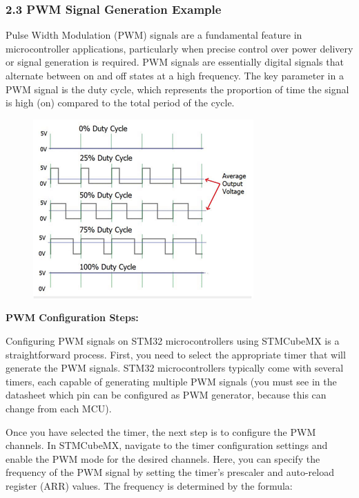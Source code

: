 \documentclass[10pt,a4paper,onecolumn]{article}
\begin{document}
\hypertarget{pwm-signal-generation-example}{%
\subsubsection{2.3 PWM Signal Generation
Example}\label{pwm-signal-generation-example}}

Pulse Width Modulation (PWM) signals are a fundamental feature in
microcontroller applications, particularly when precise control over
power delivery or signal generation is required. PWM signals are
essentially digital signals that alternate between on and off states at
a high frequency. The key parameter in a PWM signal is the duty cycle,
which represents the proportion of time the signal is high (on) compared
to the total period of the cycle.

\begin{figure}[H]
  \begin{center}
    \includegraphics[width=\dimexpr\textwidth-1cm\relax,height=\dimexpr0.25\textheight-1cm\relax,keepaspectratio]{images/60.png}
  \end{center}
\end{figure}

\textbf{PWM Configuration Steps:}

Configuring PWM signals on STM32 microcontrollers using STMCubeMX is a
straightforward process. First, you need to select the appropriate timer
that will generate the PWM signals. STM32 microcontrollers typically
come with several timers, each capable of generating multiple PWM
signals (you must see in the datasheet which pin can be configured as
PWM generator, because this can change from each MCU).

Once you have selected the timer, the next step is to configure the PWM
channels. In STMCubeMX, navigate to the timer configuration settings and
enable the PWM mode for the desired channels. Here, you can specify the
frequency of the PWM signal by setting the timer's prescaler and
auto-reload register (ARR) values. The frequency is determined by the
formula:
\end{document}
